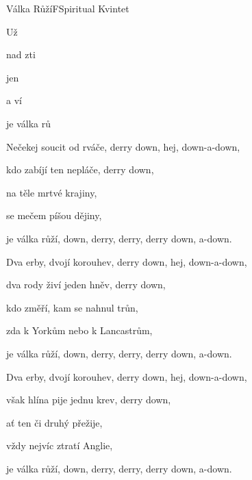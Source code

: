 \begin{song}{Válka Růží}{F}{Spiritual Kvintet}
\begin{SBVerse}
Už  

nad zti 

jen 

a ví

je válka rů 
\end{SBVerse}
\begin{SBVerse}
Nečekej soucit od rváče, derry down, hej, down-a-down,

kdo zabíjí ten nepláče, derry down,

na těle mrtvé krajiny,

se mečem píšou dějiny,

je válka růží, down, derry, derry, derry down, a-down.
\end{SBVerse}
\begin{SBVerse}
Dva erby, dvojí korouhev, derry down, hej, down-a-down,

dva rody živí jeden hněv, derry down,

kdo změří, kam se nahnul trůn, 

zda k Yorkům nebo k Lancastrům,

je válka růží, down, derry, derry, derry down, a-down.
\end{SBVerse}
\begin{SBVerse}
Dva erby, dvojí korouhev, derry down, hej, down-a-down,

však hlína pije jednu krev, derry down,

ať ten či druhý přežije, 

vždy nejvíc ztratí Anglie,

je válka růží, down, derry, derry, derry down, a-down.
\end{SBVerse}
\end{song}

\pagebreak